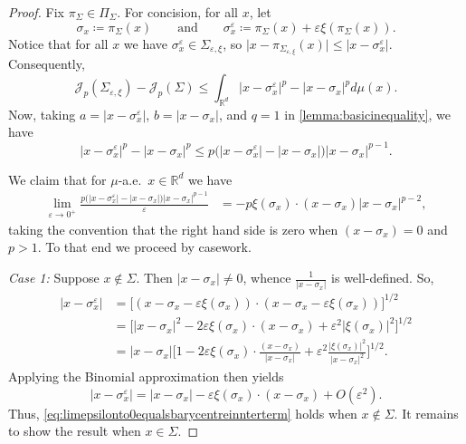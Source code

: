\documentclass[preprint, reqno]{amsart}
\renewcommand{\epsilon}{\varepsilon}
\theoremstyle{definition}
\numberwithin{equation}{section}
\begin{document}
\begin{proof}
  Fix $\pi_{\Sigma}\in \Pi_{\Sigma}$. For concision, for all $x$, let
  \[
    \sigma_x \coloneqq \pi_\Sigma(x) \qquad \text{and} \qquad
    \sigma_x^{\varepsilon} \coloneqq \pi_{\Sigma}(x) + \epsilon
    \xi(\pi_{\Sigma}(x)).
  \]
  Notice that for all $x$ we have $\sigma_x^\varepsilon \in
  \Sigma_{\epsilon,\xi}$, so $\lvert x - \pi_{\Sigma_{\varepsilon,
      \xi}}(x) \rvert \leq \lvert x - \sigma_x^\varepsilon \rvert$.
  Consequently,
  \[
    \mathscr{J}_p(\Sigma_{\epsilon, \xi}) - \mathscr{J}_p(\Sigma) \leq
    \int_{\mathbb{R}^d} |x - \sigma_x^\epsilon|^p - |x - \sigma_x|^p
    d\mu(x).
  \]
  Now, taking $a = |x - \sigma_x^\epsilon|$, $b = |x - \sigma_x|$, and
  $q = 1$ in \cref{lemma:basicinequality}, we have
  \[
    |x - \sigma_x^\epsilon|^p - |x - \sigma_x|^{p} \leq p\big(|x -
    \sigma_x^\epsilon| - |x - \sigma_x|\big)|x - \sigma_x|^{p-1}.
  \]


  We claim that for $\mu$-a.e.\ $x \in \mathbb{R}^d$ we have
  \begin{align}
    \lim_{\epsilon \to 0^{+}}\frac{p\big(|x - \sigma_x^\epsilon| - |x
    - \sigma_x|\big)|x - \sigma_x|^{p-1}}{\varepsilon}
    &= - p\xi(\sigma_x)\cdot (x - \sigma_x)|x -
      \sigma_x|^{p-2}, \label{eq:limepsilonto0equalsbarycentreinnterterm}
  \end{align}
  taking the convention that the right hand side is zero when
  $(x-\sigma_x) = 0$ and $p > 1$. To that end we proceed by casework.

  \emph{Case 1:} Suppose $x \notin \Sigma$. Then $\lvert x - \sigma_x
  \rvert \neq 0$, whence $\frac{1}{\lvert x - \sigma_x \rvert}$ is
  well-defined. So,
  \begin{align*}
    |x - \sigma_x^\epsilon|
    &= \Big[(x - \sigma_x - \epsilon \xi(\sigma_x)) \cdot (x -
      \sigma_x - \epsilon \xi(\sigma_x))\Big]^{1/2} \\
    &= \Big[\lvert x - \sigma_x \rvert^2 - 2\varepsilon \xi(\sigma_x)
      \cdot (x - \sigma_x) + \varepsilon^2 \lvert \xi(\sigma_x)
      \rvert^2 \Big]^{1/2}\\
    &=\lvert x - \sigma_x \rvert \bigg[1 - 2\epsilon
      \xi(\sigma_x)\cdot \frac{(x - \sigma_x)}{|x - \sigma_x|} +
      \epsilon^2\frac{|\xi(\sigma_x)|^2}{|x -
      \sigma_x|^2}\bigg]^{1/2}.
  \end{align*}
  Applying the Binomial approximation then yields
  \[
    \lvert x - \sigma_x^\epsilon \rvert = |x - \sigma_x| - \epsilon
    \xi(\sigma_x)\cdot (x - \sigma_x) + O(\epsilon^2).
  \]
  Thus, \eqref{eq:limepsilonto0equalsbarycentreinnterterm} holds when
  $x \notin \Sigma$. It remains to show the result when $x \in
  \Sigma$.


\end{proof}
\end{document}
